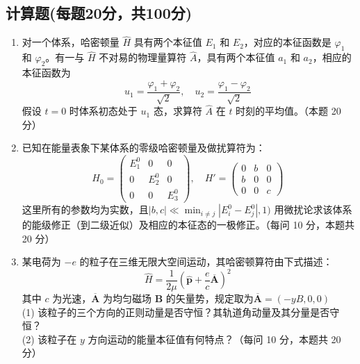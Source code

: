 \subsection{计算题(每题20分，共100分)}
\begin{enumerate}
\item 对一个体系，哈密顿量 $\hat{H}$ 具有两个本征值 $E_1$ 和 $E_2$，对应的本征函数是 $\varphi_1$ 和 $\varphi_2$。有一与 $\hat{H}$ 不对易的物理量算符 $\hat{A}$，具有两个本征值 $a_1$ 和 $a_2$，相应的本征函数为
$$u_1 = \frac{\varphi_1 + \varphi_2}{\sqrt{2}}, \quad u_2 = \frac{\varphi_1 - \varphi_2}{\sqrt{2}}~$$
假设 $t=0$ 时体系初态处于 $u_1$ 态，求算符 $\hat{A}$ 在 $t$ 时刻的平均值。（本题 20 分）
\item 已知在能量表象下某体系的零级哈密顿量及做扰算符为：
$$H_0 = \begin{pmatrix}E_1^0 & 0 & 0 \\0 & E_2^0 & 0 \\0 & 0 & E_3^0\end{pmatrix}, \quad H' = \begin{pmatrix}0 & b & 0 \\b & 0 & 0 \\0 & 0 & c\end{pmatrix}~$$
这里所有的参数均为实数，且$|b, c| \ll \min_{i \neq j} |E_i^0 - E_j^0|, 1)$
用微扰论求该体系的能级修正（到二级近似）及相应的本征态的一极修正。（每问 10 分，本题共 20 分）
\item 某电荷为 $-e$ 的粒子在三维无限大空间运动，其哈密顿算符由下式描述：
$$\hat{H} = \frac{1}{2\mu} \left( \hat{\mathbf{p}} + \frac{e}{c} \overline{\mathbf{A}} \right)^2~$$
其中 $c$ 为光速，$\overline{\mathbf{A}}$ 为均匀磁场 $\mathbf{B}$ 的矢量势，规定取为$\overline{\mathbf{A}} = (-yB, 0, 0)$\\
(1) 该粒子的三个方向的正则动量是否守恒？其轨道角动量及其分量是否守恒？\\
(2) 该粒子在 $y$ 方向运动的能量本征值有何特点？（每问 10 分，本题共 20 分）
\end{enumerate}

